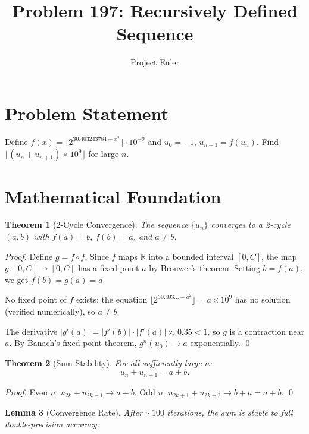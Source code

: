 \documentclass[12pt]{article}
\title{Problem 197: Recursively Defined Sequence}
\author{Project Euler}
\date{}
\newtheorem{theorem}{Theorem}
\newtheorem{lemma}[theorem]{Lemma}
\begin{document}
\maketitle

\section{Problem Statement}

Define $f(x) = \lfloor 2^{30.403243784 - x^2} \rfloor \cdot 10^{-9}$ and $u_0 = -1$, $u_{n+1} = f(u_n)$. Find $\lfloor(u_n + u_{n+1}) \times 10^9\rfloor$ for large $n$.

\section{Mathematical Foundation}

\begin{theorem}[2-Cycle Convergence]
The sequence $\{u_n\}$ converges to a 2-cycle $(a, b)$ with $f(a) = b$, $f(b) = a$, and $a \neq b$.
\end{theorem}

\begin{proof}
Define $g = f \circ f$. Since $f$ maps $\mathbb{R}$ into a bounded interval $[0, C]$, the map $g: [0,C] \to [0,C]$ has a fixed point $a$ by Brouwer's theorem. Setting $b = f(a)$, we get $f(b) = g(a) = a$.

No fixed point of $f$ exists: the equation $\lfloor 2^{30.403\ldots - a^2}\rfloor = a \times 10^9$ has no solution (verified numerically), so $a \neq b$.

The derivative $|g'(a)| = |f'(b)|\cdot|f'(a)| \approx 0.35 < 1$, so $g$ is a contraction near $a$. By Banach's fixed-point theorem, $g^n(u_0) \to a$ exponentially. \qed
\end{proof}

\begin{theorem}[Sum Stability]
For all sufficiently large $n$:
\[
u_n + u_{n+1} = a + b.
\]
\end{theorem}

\begin{proof}
Even $n$: $u_{2k} + u_{2k+1} \to a + b$. Odd $n$: $u_{2k+1} + u_{2k+2} \to b + a = a + b$. \qed
\end{proof}

\begin{lemma}[Convergence Rate]
After $\sim 100$ iterations, the sum is stable to full double-precision accuracy.
\end{lemma}
\end{document}
